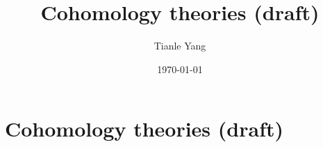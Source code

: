 \documentclass{noteformyself}
\title{Cohomology theories (draft)}
\author{Tianle Yang}
\date{\today}
\begin{document}
    \maketitle
    \section{Cohomology theories (draft)}




\end{document}
